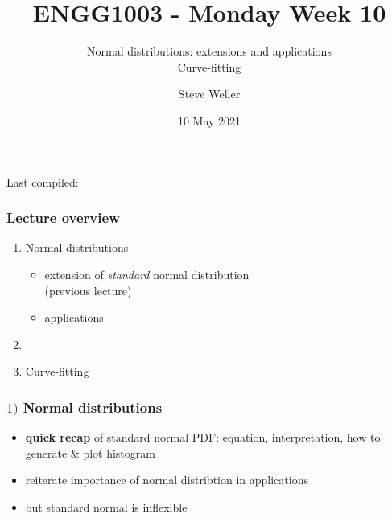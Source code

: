 \documentclass[english,14pt]{beamer}
\title{ENGG1003 - Monday Week 10}
\subtitle{Normal distributions: extensions and applications \\ Curve-fitting}%
\author{Steve Weller}
\institute{University of Newcastle}
\date{10 May 2021}
\begin{document}
\begin{flushleft}
{\scriptsize Last compiled:~\DTMnow}
\vspace*{-5mm}
\end{flushleft}
\framebreak


\begin{frame}[fragile]

\frametitle{Lecture overview}
\begin{enumerate}
	\item Normal distributions

		\begin{itemize}
			\item extension of \emph{standard} normal distribution \\ (previous lecture)
			\item applications

		\end{itemize}
	
	\item[]
	
	\item Curve-fitting
	
\end{enumerate}

\end{frame}


\begin{frame}[fragile]

\frametitle{$1)$ Normal distributions}

\begin{itemize}
	\item \textbf{quick recap} of standard normal PDF: equation, interpretation, how to generate \& plot histogram
	\item reiterate importance of normal distribtion in applications
	\item but standard normal is inflexible
\end{itemize}

\end{frame}

%
%
%
%
\end{document}
